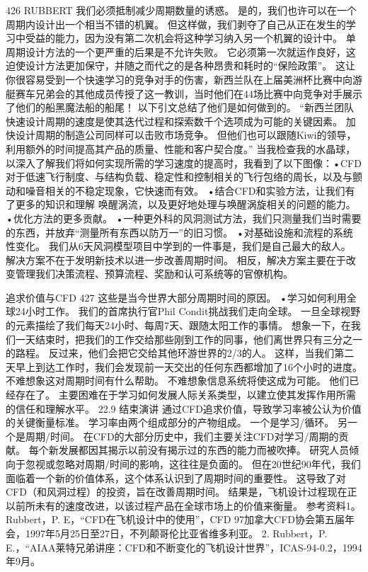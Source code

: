 \documentclass[UTF8,11pt,a4paper,openany,fontset=fandol]{ctexbook}
\begin{document}
426 RUBBERT 我们必须抵制减少周期数量的诱惑。 是的，我们也许可以在一个周期内设计出一个相当不错的机翼。 但这样做，我们剥夺了自己从正在发生的学习中受益的能力，因为没有第二次机会将这种学习纳入另一个机翼的设计中。 单周期设计方法的一个更严重的后果是不允许失败。 它必须第一次就运作良好，这迫使设计方法更加保守，并随之而代之的是各种昂贵和耗时的“保险政策”。 这让你很容易受到一个快速学习的竞争对手的伤害，新西兰队在上届美洲杯比赛中向游艇赛车兄弟会的其他成员传授了这一教训，当时他们在44场比赛中向竞争对手展示了他们的船黑魔法船的船尾！ 以下引文总结了他们是如何做到的。 “新西兰团队快速设计周期的速度是使其迭代过程和探索数千个选项成为可能的关键因素。 加快设计周期的制造公司同样可以击败市场竞争。 但他们也可以跟随Kiwi的领导，利用额外的时间提高其产品的质量、性能和客户契合度。” 当我检查我的水晶球，以深入了解我们将如何实现所需的学习速度的提高时，我看到了以下图像：•CFD对于低速飞行制度、与结构负载、稳定性和控制相关的飞行包络的周长，以及与颤动和噪音相关的不稳定现象，它快速而有效。 •结合CFD和实验方法，让我们有了更多的知识和理解 唤醒涡流，以及更好地处理与唤醒涡旋相关的问题的能力。 •优化方法的更多贡献。 •一种更外科的风洞测试方法，我们只测量我们当时需要的东西，并放弃“测量所有东西以防万一”的旧习惯。 •对基础设施和流程的系统性变化。 我们从6天风洞模型项目中学到的一件事是，我们是自己最大的敌人。 解决方案不在于发明新技术以进一步改善周期时间。 相反，解决方案主要在于改变管理我们决策流程、预算流程、奖励和认可系统等的官僚机构。

追求价值与CFD 427 这些是当今世界大部分周期时间的原因。 •学习如何利用全球24小时工作。 我们的首席执行官Phil Condit挑战我们走向全球。 一旦全球视野的元素描绘了我们每天24小时、每周7天、跟随太阳工作的事情。 想象一下，在我们一天结束时，把我们的工作交给那些刚到工作的同事，他们离世界只有三分之一的路程。 反过来，他们会把它交给其他环游世界的2/3的人。 这样，当我们第二天早上到达工作时，我们会发现前一天交出的任何东西都增加了16个小时的进度。 不难想象这对周期时间有什么帮助。 不难想象信息系统将使这成为可能。 他们已经存在了。 主要困难在于学习如何发展人际关系类型，以建立使其发挥作用所需的信任和理解水平。 22.9 结束演讲 通过CFD追求价值，导致学习率被公认为价值的关键衡量标准。 学习率由两个组成部分的产物组成。 一个是学习/循环。 另一个是周期/时间。 在CFD的大部分历史中，我们主要关注CFD对学习/周期的贡献。 每个新发展都因其揭示以前没有揭示过的东西的能力而被吹捧。 研究人员倾向于忽视或忽略对周期/时间的影响，这往往是负面的。 但在20世纪90年代，我们面临着一个新的价值体系，这个体系认识到了周期时间的重要性。 这导致了对CFD（和风洞过程）的投资，旨在改善周期时间。 结果是，飞机设计过程现在正以前所未有的速度改进，以该过程产品在全球市场上的价值来衡量。 参考资料1。 Rubbert，P. E，“CFD在飞机设计中的使用”，CFD 97加拿大CFD协会第五届年会，1997年5月25日至27日，不列颠哥伦比亚省维多利亚。 2. Rubbert，P. E.，“AIAA莱特兄弟讲座：CFD和不断变化的飞机设计世界”，ICAS-94-0.2，1994年9月。
\end{document}
